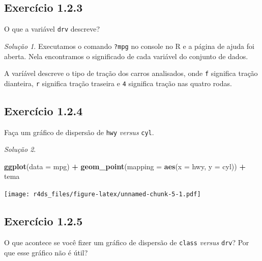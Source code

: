 \documentclass[
]{latex/krantz}
\newenvironment{Shaded}{\begin{snugshade}}{\end{snugshade}}
\newcommand{\AttributeTok}[1]{\textcolor[rgb]{0.13,0.29,0.53}{#1}}
\newcommand{\FunctionTok}[1]{\textcolor[rgb]{0.13,0.29,0.53}{\textbf{#1}}}
\newcommand{\NormalTok}[1]{#1}
\newcommand{\SpecialCharTok}[1]{\textcolor[rgb]{0.81,0.36,0.00}{\textbf{#1}}}
\theoremstyle{definition}
\theoremstyle{definition}
\theoremstyle{definition}
\theoremstyle{definition}
\theoremstyle{remark}
\newtheorem*{solution}{Solução}
\begin{document}
\hypertarget{exr1-2-3}{%
\subsection*{Exercício 1.2.3}\label{exr1-2-3}}

O que a variável \texttt{drv} descreve?

\begin{solution}
Executamos o comando \texttt{?mpg} no console no R e a página de ajuda foi aberta. Nela encontramos o significado de cada variável do conjunto de dados.

A varíável descreve o tipo de tração dos carros analisados, onde \texttt{f} significa tração dianteira, \texttt{r} significa tração traseira e \texttt{4} significa tração nas quatro rodas.
\end{solution}

\hypertarget{ex1-2-4}{%
\subsection*{Exercício 1.2.4}\label{ex1-2-4}}

Faça um gráfico de dispersão de \texttt{hwy} \emph{versus} \texttt{cyl}.

\begin{solution}
\leavevmode

\begin{Shaded}
\begin{Highlighting}[]
\FunctionTok{ggplot}\NormalTok{(}\AttributeTok{data =}\NormalTok{ mpg) }\SpecialCharTok{+}
    \FunctionTok{geom\_point}\NormalTok{(}\AttributeTok{mapping =} \FunctionTok{aes}\NormalTok{(}\AttributeTok{x =}\NormalTok{ hwy, }\AttributeTok{y =}\NormalTok{ cyl)) }\SpecialCharTok{+}
\NormalTok{    tema}
\end{Highlighting}
\end{Shaded}

\texttt{[image: r4ds\_files/figure-latex/unnamed-chunk-5-1.pdf]}

\end{solution}

\hypertarget{exr1-2-5}{%
\subsection*{Exercício 1.2.5}\label{exr1-2-5}}

O que acontece se você fizer um gráfico de dispersão de \texttt{class} \emph{versus} \texttt{drv}? Por que esse gráfico não é útil?
\end{document}
